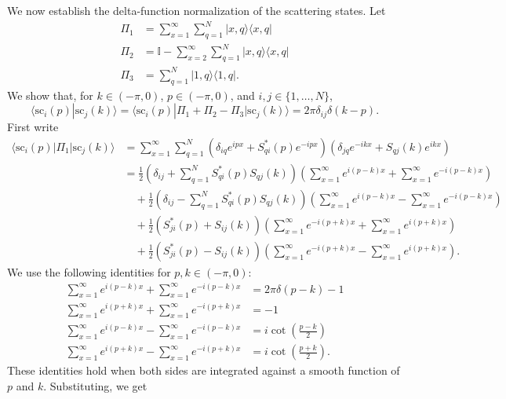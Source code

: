 \documentclass[../thesis-main/thesis-main]{subfiles}
\begin{document}
We now establish the delta-function normalization of the scattering states. Let 
\begin{align*}
\Pi_{1} & = \sum_{x=1}^{\infty}\sum_{q=1}^{N}|x,q\rangle\langle x,q|\\
\Pi_{2} & = \mathbb{I}-\sum_{x=2}^{\infty}\sum_{q=1}^{N}|x,q\rangle\langle x,q|\\
\Pi_{3} & = \sum_{q=1}^{N}|1,q\rangle\langle1,q|.\end{align*}
We show that, for $k\in(-\pi,0)$, $p\in(-\pi,0)$, and $i,j\in\{1,\ldots,N\}$,
\begin{equation}
\langle\mathrm{sc}_{i}(p)|\mathrm{sc}_{j}(k)\rangle=\langle\mathrm{sc}_{i}(p)|\Pi_{1}+\Pi_{2}-\Pi_{3}|\mathrm{sc}_{j}(k)\rangle=2\pi\delta_{ij}\delta(k-p).\label{eq:delta}\end{equation}
First write 
\begin{align*}
\langle\mathrm{sc}_{i}(p)|\Pi_{1}|\mathrm{sc}_{j}(k)\rangle & = \sum_{x=1}^{\infty}\sum_{q=1}^{N}(\delta_{iq}e^{ipx}+S_{qi}^{\ast}(p)e^{-ipx})(\delta_{jq}e^{-ikx}+S_{qj}(k)e^{ikx})\\
 & = \frac{1}{2}\left(\delta_{ij}+\sum_{q=1}^{N}S_{qi}^{\ast}(p)S_{qj}(k)\right)\left(\sum_{x=1}^{\infty}e^{i(p-k)x}+\sum_{x=1}^{\infty}e^{-i(p-k)x}\right)\\
 & \quad +\frac{1}{2}\left(\delta_{ij}-\sum_{q=1}^{N}S_{qi}^{\ast}(p)S_{qj}(k)\right)\left(\sum_{x=1}^{\infty}e^{i(p-k)x}-\sum_{x=1}^{\infty}e^{-i(p-k)x}\right)\\
 & \quad +\frac{1}{2}(S_{ji}^{\ast}(p)+S_{ij}(k))\left(\sum_{x=1}^{\infty}e^{-i(p+k)x}+\sum_{x=1}^{\infty}e^{i(p+k)x}\right)\\
 & \quad +\frac{1}{2}(S_{ji}^{\ast}(p)-S_{ij}(k))\left(\sum_{x=1}^{\infty}e^{-i(p+k)x}-\sum_{x=1}^{\infty}e^{i(p+k)x}\right).\end{align*}
We use the following identities for $p,k\in(-\pi,0)$: 
\begin{align*}
\sum_{x=1}^{\infty}e^{i(p-k)x}+\sum_{x=1}^{\infty}e^{-i(p-k)x} & = 2\pi\delta(p-k)-1 \\
\sum_{x=1}^{\infty}e^{i(p+k)x}+\sum_{x=1}^{\infty}e^{-i(p+k)x} &=-1 \\
\sum_{x=1}^{\infty}e^{i(p-k)x}-\sum_{x=1}^{\infty}e^{-i(p-k)x} & = i\cot\left(\frac{p-k}{2}\right) \\
\sum_{x=1}^{\infty}e^{i(p+k)x}-\sum_{x=1}^{\infty}e^{-i(p+k)x} &= i\cot\left(\frac{p+k}{2}\right).
\end{align*}
These identities hold when both sides are integrated against a smooth function of $p$ and $k$. Substituting, we get
\end{document}
